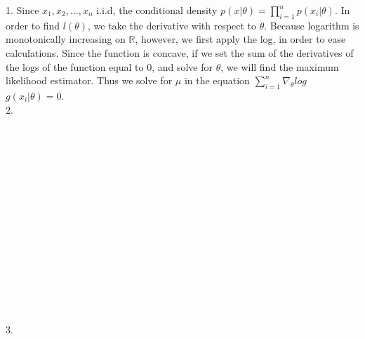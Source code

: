 \documentclass[12pt,letterpaper,boxed]{hmcpset}
\begin{document}
\begin{solution}
1. Since $x_1,x_2, ... , x_n$ i.i.d, the conditional density $p(x|\theta) =  \prod\limits_{i=1}^n p(x_i|\theta)$. In order to find $l(\theta)$, we take the derivative with respect to $\theta$. Because logarithm is monotonically increasing on $\mathbb{R}$, however, we first apply the log, in order to ease calculations. Since the function is concave, if we set the sum of the derivatives of the logs of the function equal to 0, and solve for $\theta$, we will find the maximum likelihood estimator. Thus we solve for $\mu$ in the equation $\sum\limits_{i=1}^n \nabla_{\theta} log$  $g(x_i|\theta) = 0$. \\
2. \\ \\ \\ \\ \\ \\ \\ \\ \\ \\ \\ \\ \\ \\ \\ \\ 
3. \\ \\ \\ \\ \\ \\ \\ \\ \\ \\ \\ \\ \\ 
\end{solution}


\begin{problem}

\end{problem}
\end{document}
